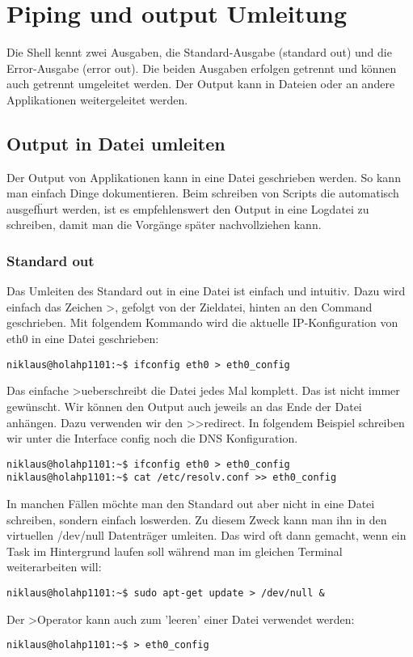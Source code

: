 \section{Piping und output Umleitung}
Die Shell kennt zwei Ausgaben, die Standard-Ausgabe (standard out) und die Error-Ausgabe (error out). Die beiden Ausgaben erfolgen getrennt und k\"onnen auch getrennt umgeleitet werden. Der Output kann in Dateien oder an andere Applikationen weitergeleitet werden.
\subsection{Output in Datei umleiten}
Der Output von Applikationen kann in eine Datei geschrieben werden. So kann man einfach Dinge dokumentieren. Beim schreiben von Scripts die automatisch ausgef\"hurt werden, ist es empfehlenswert den Output in eine Logdatei zu schreiben, damit man die Vorg\"ange sp\"ater nachvollziehen kann.
\subsubsection{Standard out}
Das Umleiten des Standard out in eine Datei ist einfach und intuitiv. Dazu wird einfach das Zeichen \textgreater, gefolgt von der Zieldatei, hinten an den Command geschrieben. Mit folgendem Kommando wird die aktuelle IP-Konfiguration von eth0 in eine Datei geschrieben:
\begin{lstlisting}[frame=single, style=shell]
niklaus@holahp1101:~$ ifconfig eth0 > eth0_config
\end{lstlisting}
Das einfache \textgreater ueberschreibt die Datei jedes Mal komplett. Das ist nicht immer gew\"unscht. Wir k\"onnen den Output auch jeweils an das Ende der Datei anh\"angen. Dazu verwenden wir den \textgreater\textgreater redirect. In folgendem Beispiel schreiben wir unter die Interface config noch die DNS Konfiguration.
\begin{lstlisting}[frame=single, style=shell]
niklaus@holahp1101:~$ ifconfig eth0 > eth0_config
niklaus@holahp1101:~$ cat /etc/resolv.conf >> eth0_config
\end{lstlisting}
In manchen F\"allen m\"ochte man den Standard out aber nicht in eine Datei schreiben, sondern einfach loswerden. Zu diesem Zweck kann man ihn in den virtuellen /dev/null Datentr\"ager umleiten. Das wird oft dann gemacht, wenn ein Task im Hintergrund laufen soll w\"ahrend man im gleichen Terminal weiterarbeiten will:
\begin{lstlisting}[frame=single, style=shell]
niklaus@holahp1101:~$ sudo apt-get update > /dev/null &
\end{lstlisting}
Der \textgreater Operator kann auch zum 'leeren' einer Datei verwendet werden:
\begin{lstlisting}[frame=single, style=shell]
niklaus@holahp1101:~$ > eth0_config
\end{lstlisting}
